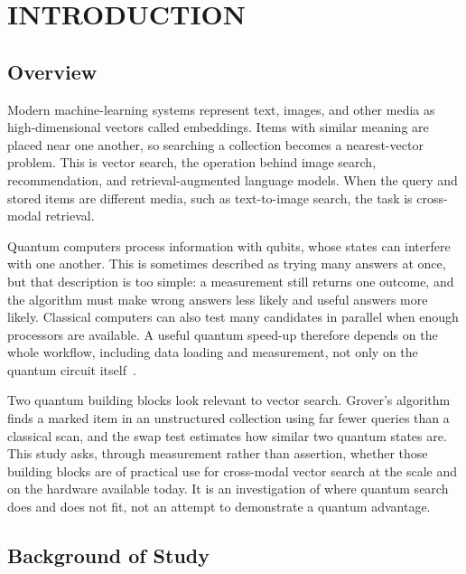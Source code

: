 \chapter{INTRODUCTION}
\label{ch:introduction}

%

\section{Overview}
\label{sec:intro:overview}

Modern machine-learning systems represent text, images, and other media as
high-dimensional vectors called embeddings. Items with similar meaning are placed
near one another, so searching a collection becomes a nearest-vector problem.
This is vector search, the operation behind image search, recommendation, and
retrieval-augmented language models. When the query and stored items are
different media, such as text-to-image search, the task is cross-modal retrieval.

Quantum computers process information with qubits, whose states can interfere
with one another. This is sometimes described as trying many answers at once, but
that description is too simple: a measurement still returns one outcome, and the
algorithm must make wrong answers less likely and useful answers more likely.
Classical computers can also test many candidates in parallel when enough
processors are available. A useful quantum speed-up therefore depends on the
whole workflow, including data loading and measurement, not only on the quantum
circuit itself~\cite{hoefler2023practicality}.

Two quantum building blocks look relevant to vector search. Grover's algorithm
finds a marked item in an unstructured collection using far fewer queries than a
classical scan, and the swap test estimates how similar two quantum states are.
This study asks, through measurement rather than assertion, whether those
building blocks are of practical use for cross-modal vector search at the scale
and on the hardware available today. It is an investigation of where quantum
search does and does not fit, not an attempt to demonstrate a quantum advantage.

\section{Background of Study}
\label{sec:background}

